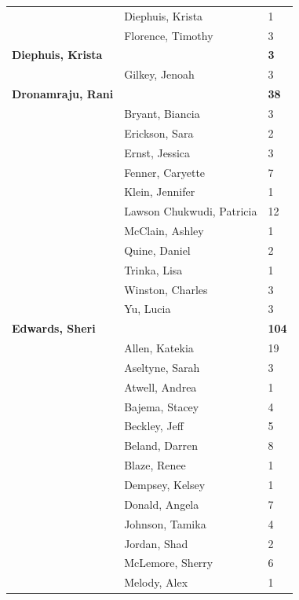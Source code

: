 \documentclass{article}\usepackage[]{graphicx}\usepackage[]{color}
\begin{document}
{\begin{longtable} { >{\raggedright}p{}|p{}p{}}
   \rowcolor[gray]{0.90} & Diephuis, Krista & 1 \\ 
   \rowcolor[gray]{0.90} & Florence, Timothy & 3 \\ 
  \textbf{Diephuis, Krista} &  & \hspace{2cm}\textbf{3} \\ 
   & Gilkey, Jenoah & 3 \\ 
  \textbf{Dronamraju, Rani} &  & \hspace{2cm}\textbf{38} \\ 
   \rowcolor[gray]{0.90} & Bryant, Biancia & 3 \\ 
   \rowcolor[gray]{0.90} & Erickson, Sara & 2 \\ 
   \rowcolor[gray]{0.90} & Ernst, Jessica & 3 \\ 
   & Fenner, Caryette & 7 \\ 
   & Klein, Jennifer & 1 \\ 
   & Lawson Chukwudi, Patricia & 12 \\ 
   \rowcolor[gray]{0.90} & McClain, Ashley & 1 \\ 
   \rowcolor[gray]{0.90} & Quine, Daniel & 2 \\ 
   \rowcolor[gray]{0.90} & Trinka, Lisa & 1 \\ 
   & Winston, Charles & 3 \\ 
   & Yu, Lucia & 3 \\ 
  \textbf{Edwards, Sheri} &  & \hspace{2cm}\textbf{104} \\ 
   \rowcolor[gray]{0.90} & Allen, Katekia & 19 \\ 
   \rowcolor[gray]{0.90} & Aseltyne, Sarah & 3 \\ 
   \rowcolor[gray]{0.90} & Atwell, Andrea & 1 \\ 
   & Bajema, Stacey & 4 \\ 
   & Beckley, Jeff & 5 \\ 
   & Beland, Darren & 8 \\ 
   \rowcolor[gray]{0.90} & Blaze, Renee & 1 \\ 
   \rowcolor[gray]{0.90} & Dempsey, Kelsey & 1 \\ 
   \rowcolor[gray]{0.90} & Donald, Angela & 7 \\ 
   & Johnson, Tamika & 4 \\ 
   & Jordan, Shad & 2 \\ 
   & McLemore, Sherry & 6 \\ 
   \rowcolor[gray]{0.90} & Melody, Alex & 1 \\ 

\end{longtable}}
\end{document}
